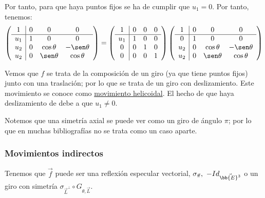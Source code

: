\begin{enumerate}
\begin{enumerate}
        Por tanto, para que haya puntos fijos se ha de cumplir que $u_1=0$. Por tanto, tenemos:
        \begin{equation*}
            \left(\begin{array}{c|ccc}
                1 & 0 & 0 & 0 \\ \hline
                u_1 & 1 & 0 & 0\\ 
                u_2 & 0 & \cos\theta & -\sen\theta \\
                u_2 & 0 & \sen\theta & \cos\theta
            \end{array}\right) = 
            \left(\begin{array}{c|ccc}
                1 & 0 & 0 & 0 \\ \hline
                u_1 & 1 & 0 & 0\\ 
                0 & 0 & 1 & 0 \\
                0 & 0 & 0 & 1
            \end{array}\right)
            \left(\begin{array}{c|ccc}
                1 & 0 & 0 & 0 \\ \hline
                0 & 1 & 0 & 0\\ 
                u_2 & 0 & \cos\theta & -\sen\theta \\
                u_2 & 0 & \sen\theta & \cos\theta
            \end{array}\right)
        \end{equation*}

        Vemos que $f$ se trata de la composición de un giro (ya que tiene puntos fijos) junto con una traslación; por lo que se trata de un giro con deslizamiento. Este movimiento se conoce como \ul{movimiento helicoidal}. El hecho de que haya deslizamiento de debe a que $u_1\neq 0$.
    \end{enumerate}
\end{enumerate}

\begin{observacion}
    Notemos que una simetría axial se puede ver como un giro de ángulo $\pi$; por lo que en muchas bibliografías no se trata como un caso aparte.
\end{observacion}


\subsubsection{Movimientos indirectos}

Tenemos que $\vec{f}$ puede ser una reflexión especular vectorial, $\sigma_{\vec{\pi}},~-Id_{\vec{\bb{E}^3}}$ o un giro con simetría $\sigma_{\vec{L}^\perp}\circ G_{\theta, \vec{L}}$.


